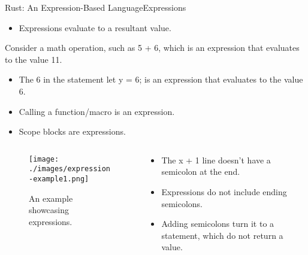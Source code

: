 \documentclass[10pt]{beamer}
\begin{document}
\begin{frame}{Rust: An Expression-Based Language}{Expressions}
    \begin{itemize}
        \item Expressions evaluate to a resultant value.\cite{rust-book}
    \end{itemize}
    Consider a math operation, such as 5 + 6, which is an expression that evaluates to the value 11.\cite{rust-book}

    \begin{itemize}
        \item The 6 in the statement let y = 6; is an expression that evaluates to the value 6.
        \item Calling a function/macro is an expression.
        \item Scope blocks are expressions.
    \end{itemize}

    \begin{columns}
        \begin{column}{0.5\textwidth}

            \begin{figure}[htpb]
                \centering
                \texttt{[image: ./images/expression-example1.png]}
                \caption{An example showcasing expressions.\cite{rust-book}}
            \end{figure}

        \end{column}

        \begin{column}{0.5\textwidth}

            \begin{itemize}
                \item The x + 1 line doesn’t have a semicolon at the end.
                \item Expressions do not include ending semicolons.
                \item Adding semicolons turn it to a statement, which do not return a value.
            \end{itemize}

        \end{column}
    \end{columns}

\end{frame}
\end{document}
